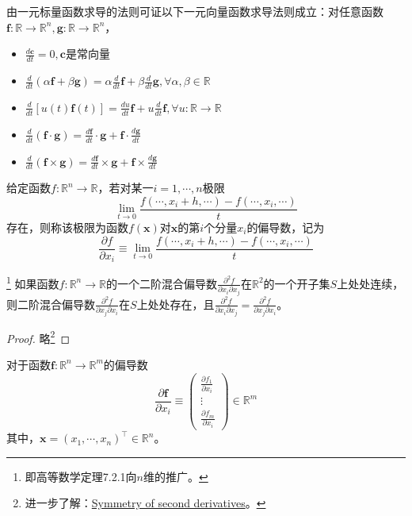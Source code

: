 \documentclass[main.tex]{subfiles}
\begin{document}
由一元标量函数求导的法则可证以下一元向量函数求导法则成立：对任意函数$\mathbf{f}:\mathbb{R}\rightarrow\mathbb{R}^n,\mathbf{g}:\mathbb{R}\rightarrow\mathbb{R}^n$，
\begin{itemize}
\item $\frac{d\mathbf{c}}{dt}=0,\mathbf{c}$是常向量
\item $\frac{d}{dt}\left(\alpha\mathbf{f}+\beta\mathbf{g}\right)=\alpha\frac{d}{dt}\mathbf{f}+\beta\frac{d}{dt}\mathbf{g},\forall \alpha,\beta\in\mathbb{R}$
\item $\frac{d}{dt}\left[u\left(t\right)\mathbf{f}\left(t\right)\right]=\frac{du}{dt}\mathbf{f}+u\frac{d}{dt}\mathbf{f},\forall u:\mathbb{R}\rightarrow\mathbb{R}$
\item $\frac{d}{dt}\left(\mathbf{f}\cdot\mathbf{g}\right)=\frac{d\mathbf{f}}{dt}\cdot\mathbf{g}+\mathbf{f}\cdot\frac{d\mathbf{g}}{dt}$
\item $\frac{d}{dt}\left(\mathbf{f}\times\mathbf{g}\right)=\frac{d\mathbf{f}}{dt}\times\mathbf{g}+\mathbf{f}\times\frac{d\mathbf{g}}{dt}$
\end{itemize}

\begin{definition}[多元标量函数的偏导数]
给定函数$f:\mathbb{R}^n\rightarrow\mathbb{R}$，若对某一$i=1,\cdots,n$极限
\[
\lim_{t\to0}\frac{f\left(\cdots,x_{i}+h,\cdots\right)-f\left(\cdots,x_i,\cdots\right)}{t}
\]
存在，则称该极限为函数$f\left(\mathbf{x}\right)$对$\mathbf{x}$的第$i$个分量$x_i$的偏导数，记为
\[\frac{\partial f}{\partial x_i}\equiv\lim_{t\to0}\frac{f\left(\cdots,x_{i}+h,\cdots\right)-f\left(\cdots,x_i,\cdots\right)}{t}
\]
\end{definition}

\begin{theorem}\footnote{即高等数学\cite[p.~16]{华工高数2009下}定理7.2.1向$n$维的推广。}
如果函数$f:\mathbb{R}^n\rightarrow\mathbb{R}$的一个二阶混合偏导数$\frac{\partial^2f}{\partial x_i\partial x_j}$在$\mathbb{R}^2$的一个开子集$S$上处处连续，则二阶混合偏导数$\frac{\partial^2f}{\partial x_j\partial x_i}$在$S$上处处存在，且$\frac{\partial^2f}{\partial x_i\partial x_j}=\frac{\partial^2f}{\partial x_j\partial x_i}$。
\end{theorem}
\begin{proof}
略\footnote{进一步了解：\href{https://en.wikipedia.org/wiki/Symmetry_of_second_derivatives}{Symmetry of second derivatives}。}
\end{proof}

\begin{definition}[向量函数的偏导数]
对于函数$\mathbf{f}:\mathbb{R}^n\rightarrow\mathbb{R}^m$的偏导数
\[
\frac{\partial \mathbf{f}}{\partial x_i}\equiv\left(\begin{array}{l}
\frac{\partial f_1}{\partial x_i}\\
\vdots\\
\frac{\partial f_m}{\partial x_i}\end{array}\right)\in\mathbb{R}^m
\]
其中，$\mathbf{x}=\left(x_1,\cdots,x_n\right)^\intercal\in\mathbb{R}^n$。
\end{definition}
\end{document}
